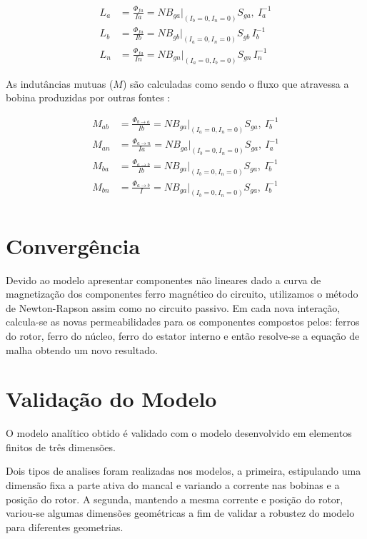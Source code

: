 \begin{align}
	L_{a} &= \frac{\Phi_{fa}}{Ia} = N B_{ga}\biggr\rvert_{(I_b = 0, I_n = 0)} S_{ga} ,\ I_a^{-1} \\
	L_{b} &= \frac{\Phi_{fa}}{Ib} = N B_{gb}\biggr\rvert_{(I_a = 0, I_n = 0)} S_{gb} \, I_b^{-1} \\
	L_{n} &= \frac{\Phi_{fa}}{In} = N B_{gn}\biggr\rvert_{(I_a = 0, I_b = 0)} S_{gn} \, I_n^{-1} %
\end{align}

As indutâncias mutuas ($M$) são calculadas como sendo o fluxo que atravessa a bobina produzidas por outras fontes :

\begin{align}
M_{ab} &= \frac{\Phi_{b \rightarrow a}}{Ib} = N B_{ga}\biggr\rvert_{(I_a = 0, I_n = 0)} S_{ga} ,\ I_b^{-1} \\
M_{an} &= \frac{\Phi_{a \rightarrow n}}{Ia} = N B_{ga}\biggr\rvert_{(I_b = 0, I_n = 0)} S_{ga} ,\ I_a^{-1} \\
M_{ba} &= \frac{\Phi_{a \rightarrow b}}{Ib} = N B_{ga}\biggr\rvert_{(I_b = 0, I_n = 0)} S_{ga} ,\ I_b^{-1} \\
M_{bn} &= \frac{\Phi_{a \rightarrow b}}{I} = N B_{ga}\biggr\rvert_{(I_b = 0, I_n = 0)} S_{ga} ,\ I_b^{-1} \\
\end{align}

\section{Convergência}

Devido ao modelo apresentar componentes não lineares dado a curva de magnetização dos componentes ferro magnético do circuito, utilizamos o método de Newton-Rapson assim como no circuito passivo. Em cada nova interação, calcula-se as novas permeabilidades para os componentes compostos pelos: ferros do rotor, ferro do núcleo, ferro do estator interno e então resolve-se a equação de malha obtendo um novo resultado.

\section{Validação do Modelo}

O modelo analítico obtido é validado com o modelo desenvolvido em elementos finitos de três dimensões.

Dois tipos de analises foram realizadas nos modelos, a primeira, estipulando uma dimensão fixa a parte ativa do mancal e variando a corrente nas bobinas e a posição do rotor. A segunda, mantendo a mesma corrente e posição do rotor, variou-se algumas dimensões geométricas a fim de validar a robustez do modelo para diferentes geometrias.

